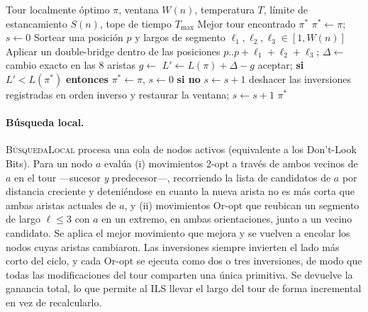 \documentclass[runningheads]{llncs}
\begin{document}
\begin{algorithm}
\caption{\textsc{Pulir} --- ILS localizado con parada por estancamiento}
\label{alg:polish}
\begin{algorithmic}[1]
\Require Tour localmente óptimo $\pi$, ventana $W(n)$, temperatura $T$,
         límite de estancamiento $S(n)$, tope de tiempo $T_{\max}$
\Ensure Mejor tour encontrado $\pi^*$
\State $\pi^*\gets\pi$; $s\gets 0$
  \State Sortear una posición $p$ y largos de segmento $\ell_1,\ell_2,\ell_3\in[1,W(n)]$
  \State Aplicar un double-bridge dentro de las posiciones $p..p{+}\ell_1{+}\ell_2{+}\ell_3$;
         $\Delta\gets$ cambio exacto en las 8 aristas
  \State $g\gets$ 
  \State $L'\gets L(\pi)+\Delta-g$
    \State aceptar; \textbf{si} $L'<L(\pi^*)$ \textbf{entonces} $\pi^*\gets\pi$, $s\gets 0$
           \textbf{si no} $s\gets s+1$
  \Else
    \State deshacer las inversiones registradas en orden inverso y restaurar la ventana;
           $s\gets s+1$
  \EndIf
\EndWhile
\State \Return $\pi^*$
\end{algorithmic}
\end{algorithm}

\paragraph{Búsqueda local.}
\textsc{BúsquedaLocal} procesa una cola de nodos activos (equivalente a
los Don't-Look Bits). Para un nodo $a$ evalúa (i) movimientos 2-opt a
través de ambos vecinos de $a$ en el tour ---sucesor \emph{y}
predecesor---, recorriendo la lista de candidatos de $a$ por distancia
creciente y deteniéndose en cuanto la nueva arista no es más corta que
ambas aristas actuales de $a$, y (ii) movimientos Or-opt que reubican un
segmento de largo $\ell\le 3$ con $a$ en un extremo, en ambas
orientaciones, junto a un vecino candidato. Se aplica el mejor
movimiento que mejora y se vuelven a encolar los nodos cuyas aristas
cambiaron. Las inversiones siempre invierten el lado más corto del
ciclo, y cada Or-opt se ejecuta como dos o tres inversiones, de modo que
todas las modificaciones del tour comparten una única primitiva. Se
devuelve la ganancia total, lo que permite al ILS llevar el largo del
tour de forma incremental en vez de recalcularlo.
\end{document}
